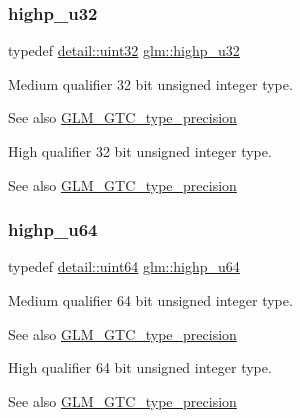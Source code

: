 \subsubsection{\texorpdfstring{highp\+\_\+u32}{highp\_u32}}
{\footnotesize\ttfamily typedef \hyperlink{namespaceglm_1_1detail_ade6cfbf377022aaa391af8cd50489222}{detail\+::uint32} \hyperlink{group__gtc__type__precision_gae8e8a2c712653891a03c171795286ac5}{glm\+::highp\+\_\+u32}}

Medium qualifier 32 bit unsigned integer type. \begin{DoxySeeAlso}{See also}
\hyperlink{group__gtc__type__precision}{G\+L\+M\+\_\+\+G\+T\+C\+\_\+type\+\_\+precision}
\end{DoxySeeAlso}
High qualifier 32 bit unsigned integer type. \begin{DoxySeeAlso}{See also}
\hyperlink{group__gtc__type__precision}{G\+L\+M\+\_\+\+G\+T\+C\+\_\+type\+\_\+precision} 
\end{DoxySeeAlso}
\mbox{\label{group__gtc__type__precision_ga6006ea883d3c0491791650b2fb84de39}} 
\subsubsection{\texorpdfstring{highp\+\_\+u64}{highp\_u64}}
{\footnotesize\ttfamily typedef \hyperlink{namespaceglm_1_1detail_adec4b19bf4982125e122db2fe03c5810}{detail\+::uint64} \hyperlink{group__gtc__type__precision_ga6006ea883d3c0491791650b2fb84de39}{glm\+::highp\+\_\+u64}}

Medium qualifier 64 bit unsigned integer type. \begin{DoxySeeAlso}{See also}
\hyperlink{group__gtc__type__precision}{G\+L\+M\+\_\+\+G\+T\+C\+\_\+type\+\_\+precision}
\end{DoxySeeAlso}
High qualifier 64 bit unsigned integer type. \begin{DoxySeeAlso}{See also}
\hyperlink{group__gtc__type__precision}{G\+L\+M\+\_\+\+G\+T\+C\+\_\+type\+\_\+precision} 
\end{DoxySeeAlso}
\mbox{\label{group__gtc__type__precision_ga8a60abe782749c504fb5ae51eb8b49cc}} 
